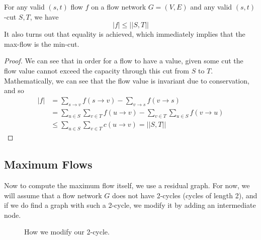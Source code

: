 \documentclass{article}
\begin{document}
    \begin{theorem}
      For any valid $(s, t)$ flow $f$ on a flow network $G = (V, E)$ and any valid $(s, t)$-cut $S, T$, we have 
      \begin{equation}
        |f| \leq ||S, T||
      \end{equation} 
      It also turns out that equality is achieved, which immediately implies that the max-flow is the min-cut. 
    \end{theorem}
    \begin{proof}
      We can see that in order for a flow to have a value, given some cut the flow value cannot exceed the capacity through this cut from $S$ to $T$. Mathematically, we can see that the flow value is invariant due to conservation, and so  
      \begin{align}
        |f| & = \sum_{s \rightarrow v} f(s \rightarrow v) - \sum_{v \rightarrow s} f(v \rightarrow s) \\ 
            & = \sum_{u \in S} \sum_{v \in T} f(u \rightarrow v) - \sum_{v \in T} \sum_{u \in S} f(v \rightarrow u) \\ 
            & \leq \sum_{u \in S} \sum_{v \in T} c(u \rightarrow v) = ||S, T||
      \end{align}
    \end{proof} 

  \subsection{Maximum Flows}  

    Now to compute the maximum flow itself, we use a residual graph. For now, we will assume that a flow network $G$ does not have 2-cycles (cycles of length 2), and if we do find a graph with such a 2-cycle, we modify it by adding an intermediate node. 

    \begin{figure}[H]
      \centering 
      \caption{How we modify our 2-cycle.} 
      \label{fig:cycle_mod}
    \end{figure}
\end{document}
